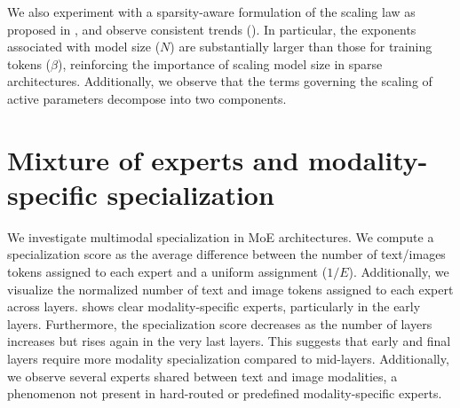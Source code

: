 We also experiment with a sparsity-aware formulation of the scaling law as proposed in \citep{abnar2025parameters}, and observe consistent trends (). In particular, the exponents associated with model size ($N$) are substantially larger than those for training tokens ($\beta$), reinforcing the importance of scaling model size in sparse architectures. Additionally, we observe that the terms governing the scaling of active parameters decompose into two components.





\section{Mixture of experts and modality-specific specialization}
\label{app:moes}





We investigate multimodal specialization in MoE architectures. We compute a
specialization score as the average difference between the number of text/images
tokens assigned to each expert and a uniform assignment ($1/E$). Additionally,
we visualize the normalized number of text and image tokens assigned to each
expert across layers.  shows clear modality-specific
experts, particularly in the early layers. Furthermore, the specialization score
decreases as the number of layers increases but rises again in the very last
layers. This suggests that early and final layers require more modality
specialization compared to mid-layers. Additionally, we observe several experts
shared between text and image modalities, a phenomenon not present in
hard-routed or predefined modality-specific experts.


        



